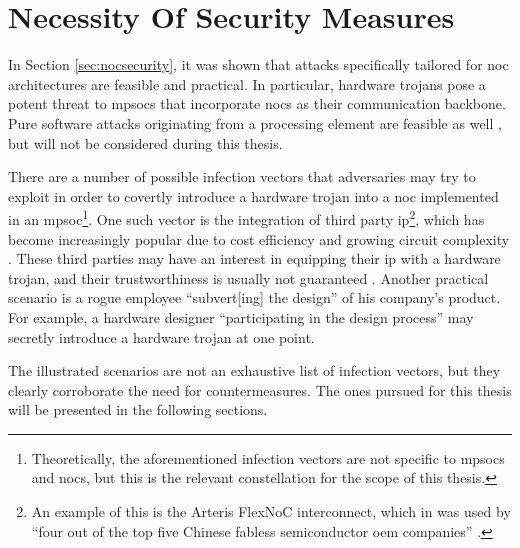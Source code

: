 \section{Necessity Of Security Measures}\label{sec:necessityofsecurity}
In Section \ref{sec:nocsecurity}, it was shown that attacks specifically tailored for \gls{noc} architectures are feasible and practical. In
particular, hardware trojans pose a potent threat to \glspl{mpsoc} that incorporate \glspl{noc} as their communication backbone. Pure software attacks
originating from a processing element are feasible as well \cites(e.g.)(){biswas15routerattack}{kocher04embeddedsecurity}, but will not be considered
during this thesis. %

There are a number of possible infection vectors that adversaries may try to exploit in order to covertly introduce a hardware trojan into a \gls{noc}
implemented in an \gls{mpsoc}\footnote{Theoretically, the aforementioned infection vectors are not specific to \glspl{mpsoc} and \glspl{noc}, but
this is the relevant constellation for the scope of this thesis.}. One such vector is the integration of third party \gls{ip}\footnote{An example of
this is the Arteris FlexNoC interconnect, which in \citeyear{ancajas14fortnocs} was used by \enquote{four out of the top five Chinese fabless
semiconductor \gls{oem} companies}
\cite[2]{ancajas14fortnocs}.}, which has become increasingly popular due to cost efficiency and growing circuit complexity
\cites[1]{ancajas14fortnocs}[2]{bhunia14hardwaretrojans}. These third parties may have an interest in equipping their \gls{ip} with a hardware trojan,
and their trustworthiness is usually not guaranteed \cite[3]{sethumadhavan15trustworthyhardware}.
Another practical scenario is a rogue employee \enquote{subvert[ing] the design} \cite[3]{sethumadhavan15trustworthyhardware} of his
company's product. For example, a hardware designer \enquote{participating in the design process} \cite[3]{sethumadhavan15trustworthyhardware} may
secretly introduce a hardware trojan at one point. 

The illustrated scenarios are not an exhaustive list of infection vectors, but they clearly corroborate the need for countermeasures. The ones pursued
for this thesis will be presented in the following sections.

